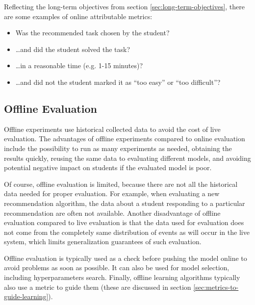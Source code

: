Reflecting the long-term objectives from section \ref{sec:long-term-objectives},
  there are some examples of online attributable metrics:
\begin{itemize}
  \item Was the recommended task chosen by the student?
  \item \ldots and did the student solved the task?
  \item \ldots in a reasonable time (e.g. 1-15 minutes)?
  \item \ldots and did not the student marked it as ``too easy'' or ``too difficult''?
\end{itemize}





\subsection{Offline Evaluation}

Offline experiments use historical collected data
  to avoid the cost of live evaluation.
The advantages of offline experiments compared to online evaluation include
  the possibility to run as many experiments as needed,
  obtaining the results quickly,
  reusing the same data to evaluating different models,
  and avoiding potential negative impact on students if the evaluated model is poor.

Of course, offline evaluation is limited,
  because there are not all the historical data needed
  for proper evaluation.
For example, when evaluating a new recommendation algorithm,
  the data about a student responding to a particular recommendation
  are often not available.
Another disadvantage of offline evaluation compared to live evaluation
  is that the data used for evaluation does not come from the completely
  same distribution of events as will occur in the live system,
  which limits generalization guarantees of such evaluation.

Offline evaluation is typically used as a check before pushing
  the model online to avoid problems as soon as possible.
It can also be used for model selection,
  including hyperparameters search.
Finally, offline learning algorithms typically also use
  a metric to guide them
  (these are discussed in section \ref{sec:metrics-to-guide-learning}).



